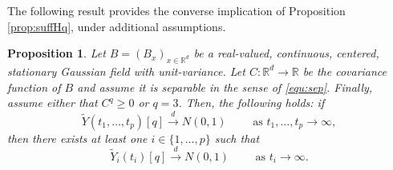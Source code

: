 \documentclass[12pt]{article}
\DeclareMathOperator{\1}{1}
\newcommand{\R}{\mathbb{R}}
\theoremstyle{plain}
\newtheorem{proposition}[theorem]{Proposition}
\theoremstyle{definition}
\begin{document}
The following result provides the converse implication of Proposition \ref{prop:suffHq}, under additional assumptions.
\begin{proposition}\label{prop:necHq}
    Let $B=(B_x)_{x\in\R^d}$ be a real-valued, continuous, centered, stationary Gaussian field with unit-variance. Let $C:\R^d \rightarrow \R$ be the covariance function of $B$ and assume it is separable in the sense of \eqref{equ:sep}. Finally, assume either that $C^q\ge 0$ or $q=3$. Then, the following holds: if \begin{equation}
         \widetilde{Y}(t_1,\ldots,t_p)[q]\overset{d}{\rightarrow} N(0,1) \quad \quad \text{ as } t_1,\ldots,t_p \to \infty,
        \end{equation}
        then there exists at least one $i\in\{1,\ldots,p\}$ such that
        \begin{equation}
            \widetilde{Y}_{i}(t_i)[q]\overset{d}{\rightarrow} N(0,1) \quad \quad \text{ as } t_i \to \infty.
        \end{equation}
        
\end{proposition}
\end{document}
